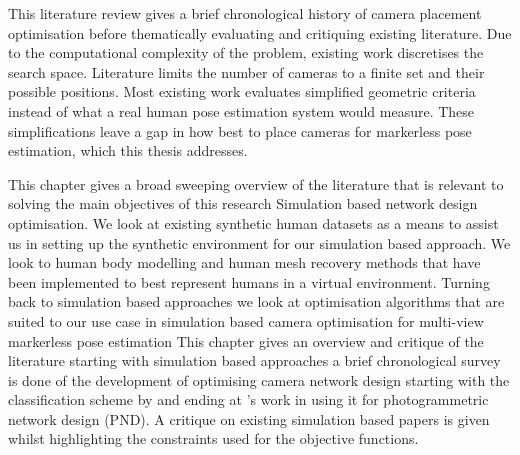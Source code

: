 \label{chap:literature}

This literature review gives a brief chronological history of camera placement optimisation before thematically evaluating and critiquing existing literature. Due to the computational complexity of the problem, existing work discretises the search space. Literature limits the number of cameras to a finite set and their possible positions. Most existing work evaluates simplified geometric criteria instead of what a real human pose estimation system would measure. These simplifications leave a gap in how best to place cameras for markerless pose estimation, which this thesis addresses.

This chapter gives a broad sweeping overview of the literature that is relevant to solving the main objectives of this research
Simulation based network design optimisation. We look at existing synthetic human datasets as a means to assist us in setting up the synthetic environment for our simulation based approach. We look to human body modelling and human mesh recovery methods that have been implemented to best represent humans in a virtual environment. Turning back to simulation based approaches we look at optimisation algorithms that are suited to our use case in simulation based camera optimisation for multi-view markerless pose estimation 
This chapter gives an overview and critique of the literature starting with simulation based approaches a brief chronological survey is done of the development of optimising camera network design starting with the classification scheme by \citet{grafarend1974optimization} and ending at \citet{mason1995expert}'s work in using it for photogrammetric network design (PND). A critique on existing simulation based papers is given whilst highlighting the constraints used for the objective functions.

